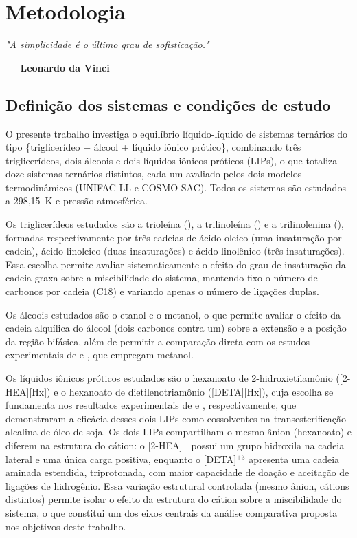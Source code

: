 \chapter{Metodologia}
\label{cap:metodologia}

\epigraph{\textit{"A simplicidade é o último grau de sofisticação."}}{\textbf{--- Leonardo da Vinci}}

\section{Definição dos sistemas e condições de estudo}
\label{sec:sistemas}

O presente trabalho investiga o equilíbrio líquido-líquido de sistemas ternários do tipo \{triglicerídeo + álcool + líquido iônico prótico\}, combinando três triglicerídeos, dois álcoois e dois líquidos iônicos próticos (LIPs), o que totaliza doze sistemas ternários distintos, cada um avaliado pelos dois modelos termodinâmicos (UNIFAC-LL e COSMO-SAC). Todos os sistemas são estudados a 298,15~K e pressão atmosférica.

Os triglicerídeos estudados são a trioleína (), a trilinoleína () e a trilinolenina (), formadas respectivamente por três cadeias de ácido oleico (uma insaturação por cadeia), ácido linoleico (duas insaturações) e ácido linolênico (três insaturações). Essa escolha permite avaliar sistematicamente o efeito do grau de insaturação da cadeia graxa sobre a miscibilidade do sistema, mantendo fixo o número de carbonos por cadeia (C18) e variando apenas o número de ligações duplas.

Os álcoois estudados são o etanol e o metanol, o que permite avaliar o efeito da cadeia alquílica do álcool (dois carbonos contra um) sobre a extensão e a posição da região bifásica, além de permitir a comparação direta com os estudos experimentais de  e , que empregam metanol.

Os líquidos iônicos próticos estudados são o hexanoato de 2-hidroxietilamônio ([2-HEA][Hx]) e o hexanoato de dietilenotriamônio ([DETA][Hx]), cuja escolha se fundamenta nos resultados experimentais de  e , respectivamente, que demonstraram a eficácia desses dois LIPs como cossolventes na transesterificação alcalina de óleo de soja. Os dois LIPs compartilham o mesmo ânion (hexanoato) e diferem na estrutura do cátion: o [2-HEA]$^+$ possui um grupo hidroxila na cadeia lateral e uma única carga positiva, enquanto o [DETA]$^{+3}$ apresenta uma cadeia aminada estendida, triprotonada, com maior capacidade de doação e aceitação de ligações de hidrogênio. Essa variação estrutural controlada (mesmo ânion, cátions distintos) permite isolar o efeito da estrutura do cátion sobre a miscibilidade do sistema, o que constitui um dos eixos centrais da análise comparativa proposta nos objetivos deste trabalho.

